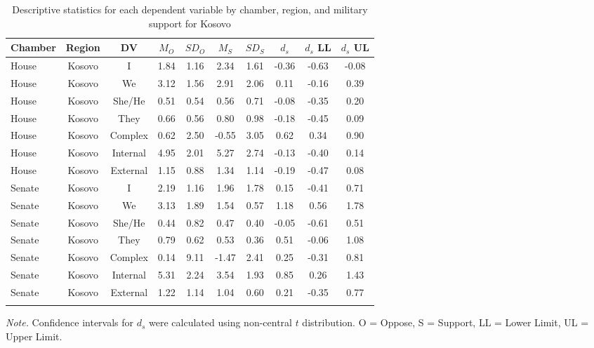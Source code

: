 \documentclass[english,,man]{apa6}
\theoremstyle{definition}
\theoremstyle{definition}
\theoremstyle{definition}
\theoremstyle{remark}
\begin{document}
\begin{table}[tbp]
\begin{center}
\begin{threeparttable}
\caption{\label{tab:Ktable}Descriptive statistics for each dependent variable by chamber, 
          region, and military support for Kosovo}
\small{
\begin{tabular}{lccccccccc}
\toprule
Chamber & Region & DV & $M_O$ & $SD_O$ & $M_S$ & $SD_S$ & $d_s$ & $d_s$ LL & $d_s$ UL\\
\midrule
House & Kosovo & I & 1.84 & 1.16 & 2.34 & 1.61 & -0.36 & -0.63 & -0.08\\
House & Kosovo & We & 3.12 & 1.56 & 2.91 & 2.06 & 0.11 & -0.16 & 0.39\\
House & Kosovo & She/He & 0.51 & 0.54 & 0.56 & 0.71 & -0.08 & -0.35 & 0.20\\
House & Kosovo & They & 0.66 & 0.56 & 0.80 & 0.98 & -0.18 & -0.45 & 0.09\\
House & Kosovo & Complex & 0.62 & 2.50 & -0.55 & 3.05 & 0.62 & 0.34 & 0.90\\
House & Kosovo & Internal & 4.95 & 2.01 & 5.27 & 2.74 & -0.13 & -0.40 & 0.14\\
House & Kosovo & External & 1.15 & 0.88 & 1.34 & 1.14 & -0.19 & -0.47 & 0.08\\
Senate & Kosovo & I & 2.19 & 1.16 & 1.96 & 1.78 & 0.15 & -0.41 & 0.71\\
Senate & Kosovo & We & 3.13 & 1.89 & 1.54 & 0.57 & 1.18 & 0.56 & 1.78\\
Senate & Kosovo & She/He & 0.44 & 0.82 & 0.47 & 0.40 & -0.05 & -0.61 & 0.51\\
Senate & Kosovo & They & 0.79 & 0.62 & 0.53 & 0.36 & 0.51 & -0.06 & 1.08\\
Senate & Kosovo & Complex & 0.14 & 9.11 & -1.47 & 2.41 & 0.25 & -0.31 & 0.81\\
Senate & Kosovo & Internal & 5.31 & 2.24 & 3.54 & 1.93 & 0.85 & 0.26 & 1.43\\
Senate & Kosovo & External & 1.22 & 1.14 & 1.04 & 0.60 & 0.21 & -0.35 & 0.77\\
\bottomrule
\addlinespace
\end{tabular}
}
\begin{tablenotes}[para]
\normalsize{\textit{Note.} Confidence intervals for $d_s$ were calculated using 
          non-central $t$ distribution. O = Oppose, S = Support, LL = Lower Limit, UL = Upper Limit.}
\end{tablenotes}
\end{threeparttable}
\end{center}
\end{table}
\end{document}
